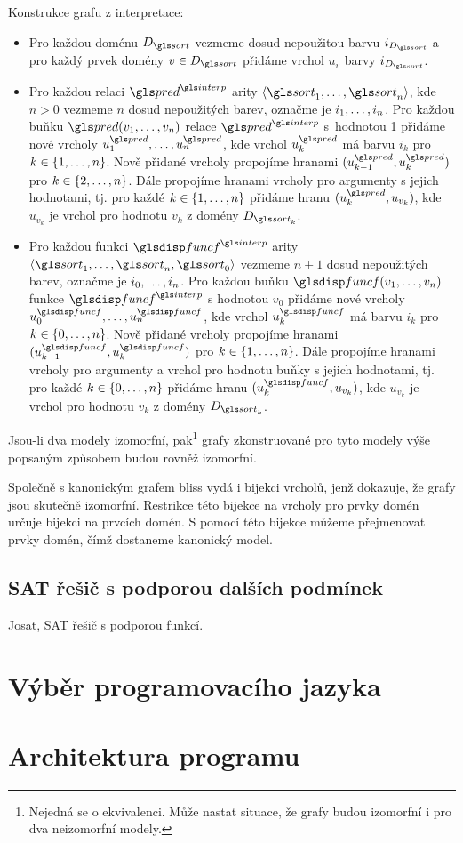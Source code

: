 Konstrukce grafu z interpretace:
\begin{itemize}
\item Pro každou doménu $D_\sort$ vezmeme dosud nepoužitou barvu $i_{D_\sort}$
  a pro každý prvek domény $v \in D_\sort$ přidáme vrchol $u_v$ barvy
  $i_{D_\sort}$.
\item Pro každou relaci $\pred^\interp$ arity
  $\langle \sort_1 \comdots \sort_n \rangle$, kde $n > 0$
  vezmeme $n$ dosud nepoužitých barev, označme je
  $i_1 , \ldots, i_n$.
  Pro každou buňku $\pred(v_1 \comdots v_n)$ relace $\pred^\interp$
  s~hodnotou 1 přidáme nové vrcholy $u_1^\pred \comdots u_n^\pred$,
  kde vrchol $u_k^\pred$ má barvu $i_k$ pro $k \in \{ 1 , \ldots, n \}$.
  Nově přidané vrcholy propojíme hranami $(u_{k-1}^\pred, u_k^\pred)$ pro
  $k \in \{ 2 , \ldots, n \}$. Dále propojíme hranami
  vrcholy pro argumenty s jejich hodnotami, tj. pro
  každé $k \in \{ 1 , \ldots, n \}$ přidáme hranu
  $(u_k^\pred, u_{v_k})$, kde $u_{v_k}$ je vrchol pro hodnotu
  $v_k$ z domény $D_{\sort_k}$.
\item Pro každou funkci $\func^\interp$ arity
  $\langle \sort_1 \comdots \sort_n, \sort_0 \rangle$
  vezmeme $n + 1$ dosud ne\-pou\-ži\-tých barev, označme je
  $i_0 , \ldots, i_n$.
  Pro každou buňku $\func(v_1 \comdots v_n)$ funkce $\func^\interp$
  s hodnotou $v_0$ přidáme nové vrcholy $u_0^\func \comdots u_n^\func$,
  kde vrchol $u_k^\func$ má barvu $i_k$ pro $k \in \{ 0 , \ldots, n \}$.
  Nově přidané vrcholy propojíme hranami $(u_{k-1}^\func, u_k^\func)$ pro
  $k \in \{ 1 , \ldots, n \}$. Dále propojíme hranami
  vrcholy pro argumenty a vrchol pro hodnotu buňky s jejich hodnotami, tj. pro
  každé $k \in \{ 0 , \ldots, n \}$ přidáme hranu
  $(u_k^\func, u_{v_k})$, kde $u_{v_k}$ je vrchol pro hodnotu
  $v_k$ z domény $D_{\sort_k}$.
\end{itemize}
Jsou-li dva modely izomorfní, pak\footnote{Nejedná se o ekvivalenci.
Může nastat situace, že grafy budou izomorfní i pro dva neizomorfní modely.}
grafy zkonstruované pro tyto modely výše popsaným způsobem budou
rovněž izomorfní.

%

Společně s kanonickým grafem bliss vydá i bijekci vrcholů,
jenž dokazuje, že grafy jsou skutečně izomorfní.
Restrikce této bijekce na vrcholy pro prvky domén
určuje bijekci na prvcích domén.
S pomocí této bijekce můžeme přejmenovat prvky
domén, čímž dostaneme kanonický model.

\subsection{SAT řešič s podporou dalších podmínek}

Josat, SAT řešič s podporou funkcí.

\section{Výběr programovacího jazyka}

\section{Architektura programu}
